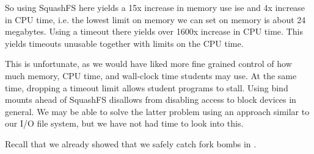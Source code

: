 So using SquashFS here yields a 15x increase in memory use ise and 4x increase
in CPU time, i.e. the lowest limit on memory we can set on memory is about 24
megabytes. Using a timeout there yields over 1600x increase in CPU time. This
yields timeouts unusable together with limits on the CPU time.

This is unfortunate, as we would have liked more fine grained control of how
much memory, CPU time, and wall-clock time students may use. At the same time,
dropping a timeout limit allows student programs to stall.  Using bind mounts
ahead of SquashFS disallows from disabling access to block devices in general.
We may be able to solve the latter problem using an approach similar to our I/O
file system, but we have not had time to look into this.

Recall that we already showed that we safely catch fork bombs in
.


